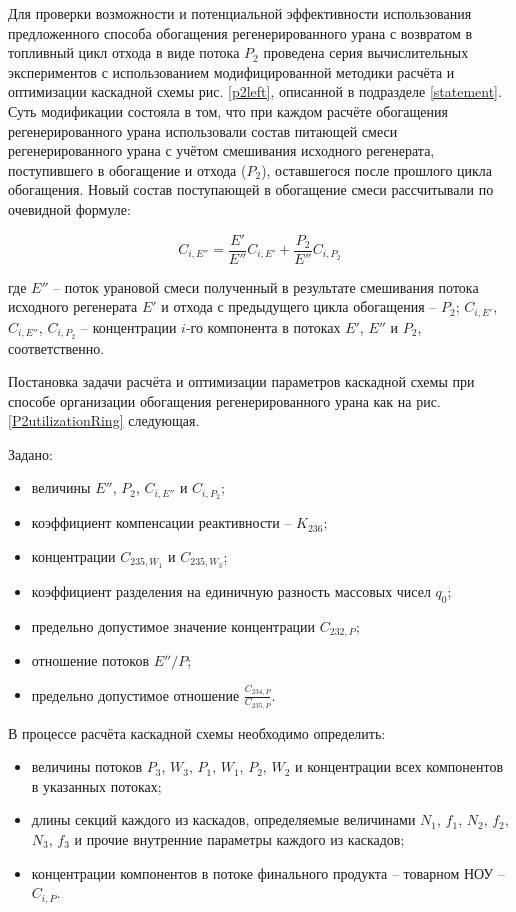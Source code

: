 Для проверки возможности и потенциальной эффективности использования предложенного способа обогащения регенерированного урана с возвратом в топливный цикл отхода в виде потока $P_2$ проведена серия вычислительных экспериментов с использованием модифицированной методики расчёта и оптимизации каскадной схемы рис. \ref{p2left}, описанной в подразделе \ref{statement}. Суть модификации состояла в том, что при каждом расчёте обогащения регенерированного урана использовали состав питающей смеси регенерированного урана с учётом смешивания исходного регенерата, поступившего в обогащение и отхода ($P_2$), оставшегося после прошлого цикла обогащения. Новый состав поступающей в обогащение смеси рассчитывали по очевидной формуле:

\begin{equation} \label{Cie} 
    C_{i,E''}=\frac{E'}{E''}{C_{i,{E'}}} + \frac{P_2}{E''}{C_{i,{P_2}}}
\end{equation}

где $E''$ -- поток урановой смеси полученный в результате смешивания потока исходного регенерата $E'$ и отхода с предыдущего цикла обогащения -- $P_2$;  $C_{i,E'}$, $C_{i,E''}$, $C_{i,{P_2}}$ -- концентрации $i$-го компонента в потоках $E'$, $E''$ и $P_2$, соответственно.     

Постановка задачи расчёта и оптимизации параметров каскадной схемы при способе организации обогащения регенерированного урана как на рис. \ref{P2utilizationRing} следующая.

Задано:

\begin{itemize}
    \item величины $E''$, $P_2$, $C_{i,E''}$ и $C_{i,{P_2}}$; 
    \item коэффициент компенсации реактивности -- $K_{236}$;
    \item концентрации $C_{235,{W_1}}$ и $C_{235,{W_3}}$;
    \item коэффициент разделения на единичную разность массовых чисел $q_{0}$;
    \item предельно допустимое значение концентрации $C_{232,{P}}$;
    \item отношение потоков ${E''}/P$;
    \item предельно допустимое отношение $\frac{C_{234,{P}}}{C_{235,{P}}}$. 
\end{itemize}

В процессе расчёта каскадной схемы необходимо определить:

\begin{itemize}
    \item величины потоков $P_3$, $W_3$, $P_1$, $W_1$, $P_2$, $W_2$ и концентрации всех компонентов в указанных потоках; 
    \item длины секций каждого из каскадов, определяемые величинами $N_1$, $f_1$, $N_2$, $f_2$, $N_3$, $f_3$ и прочие внутренние параметры каждого из каскадов;
    \item концентрации компонентов в потоке финального продукта -- товарном НОУ -- $C_{i,P}$.
\end{itemize}

